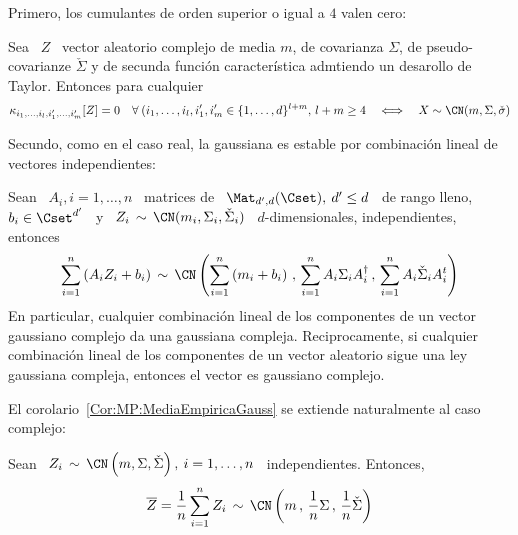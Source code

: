 
Primero, los cumulantes de orden superior o igual a $4$ valen cero:
%
\begin{lema}
%
  Sea \ $Z$ \ vector aleatorio complejo de media $m$, de covarianza $\Sigma$, de
  pseudo-covarianze  $\check{\Sigma}$ y  de  secunda funci\'on  caracter\'istica
  admtiendo un desarollo de Taylor. Entonces para cualquier
  \[
  \kappa_{i_1,\ldots,i_l,i'_1,\ldots,i'_m}[Z] = 0 \quad \forall \: ( i_1, \ldots
  , i_l  , i'_1  , i'_m  \in \{  1 , \ldots  , d  \}^{l+m}, \,  l+m \ge  4 \quad
  \Longleftrightarrow \quad X \sim \CN(m,\Sigma,\check{\sigma})
  \]
\end{lema}
%

Secundo, como en  el caso real, la gaussiana es  estable por combinaci\'on lineal
de vectores independientes:
%
\begin{teorema}[Stabilidad]
\label{Teo:MP:StabilidadGaussianaCompleja}
%
  Sean \ $A_i , i = 1,\ldots,n$  \ matrices de \ $\Mat_{d',d}(\Cset), \: d' \le d$
  \  de   rango  lleno,   $b_i  \in  \Cset^{d'}$   \  y   \  $Z_i  \,   \sim  \,
  \CN(m_i,\Sigma_i,\check{\Sigma}_i)$   \   $d$-dimensionales,  independientes,
  entonces
  \[
  \sum_{i=1}^n \left( A_i  Z_i + b_i \right) \,  \sim \, \CN\left( \sum_{i=1}^n
    \left( m_i + b_i \right) \, ,  \, \sum_{i=1}^n A_i \Sigma_i A_i^\dag \, , \,
    \sum_{i=1}^n A_i \check{\Sigma}_i A_i^t \right)
  \]
  En particular, cualquier combinaci\'on lineal  de los componentes de un vector
  gaussiano complejo  da una  gaussiana compleja.  Reciprocamente,  si cualquier
  combinaci\'on lineal de  los componentes de un vector  aleatorio sigue una ley
  gaussiana compleja, entonces el vector es gaussiano complejo.
\end{teorema}
%
El corolario~\ref{Cor:MP:MediaEmpiricaGauss} se extiende naturalmente al caso complejo:
%
\begin{corolario}\label{Cor:MP:MediaEmpiricaGaussCompleja}
%
  Sean \ $Z_i \, \sim \, \CN\left(  m , \Sigma , \check{\Sigma} \right), \: i =
  1, \ldots , n$ \ independientes. Entonces,
  \[
  \overline{Z} =  \frac{1}{n} \sum_{i=1}^n Z_i \,  \sim \, \CN\left( m  \, , \,
    \frac{1}{n} \Sigma \, , \, \frac{1}{n} \check{\Sigma} \right)
  \]
\end{corolario}

